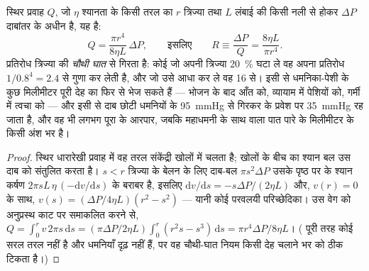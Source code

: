 \begin{theorem}[प्वाज़ेई का नियम और वाहिकीय प्रतिरोध]\label{thm:b2:blood-circulation:poiseuille}
स्थिर प्रवाह $Q$, जो $\eta$ श्यानता के किसी तरल का $r$ त्रिज्या तथा
$L$ लंबाई की किसी नली से होकर $\Delta P$ दाबांतर के अधीन है, यह
है:
\[
Q = \frac{\pi r^{4}}{8\eta L}\,\Delta P, \qquad \text{इसलिए}\qquad
R \equiv \frac{\Delta P}{Q} = \frac{8\eta L}{\pi r^{4}} .
\]
प्रतिरोध त्रिज्या की \emph{चौथी घात} से गिरता है: कोई
 जो अपनी त्रिज्या \qty{20}{\%} घटा ले वह अपना
प्रतिरोध $1/0.8^{4} = 2.4$ से गुणा कर लेती है, और जो उसे आधा कर ले वह 16 से। इसी से
धमनिका-पेशी के कुछ मिलीमीटर पूरी देह का  फिर से भेज
सकते हैं --- भोजन के बाद आँत को, व्यायाम में पेशियों को, गर्मी में
त्वचा को --- और इसी से दाब छोटी धमनियों के
\qty{95}{mmHg} से गिरकर  के प्रवेश पर
\qty{35}{mmHg} रह जाता है, और वह भी लगभग पूरा
 के आरपार, जबकि महाधमनी के साथ वाला पात पारे के मिलीमीटर के
किसी अंश भर है।
\end{theorem}
\begin{proof}
स्थिर धारारेखी प्रवाह में वह तरल संकेंद्री खोलों में चलता है; खोलों
के बीच का श्यान बल उस दाब को संतुलित करता है। $s < r$ त्रिज्या के
बेलन के लिए दाब-बल $\pi s^{2}\Delta P$
उसके पृष्ठ पर के श्यान कर्षण $2\pi s L\,\eta\,(-\mathrm{d}v/
\mathrm{d}s)$ के बराबर है, इसलिए $\mathrm{d}v/\mathrm{d}s = -s\Delta P/(2\eta L)$
और, $v(r) = 0$ के साथ, $v(s) = (\Delta P/4\eta L)(r^{2} - s^{2})$ --- यानी कोई
परवलयी परिच्छेदिका। उस वेग को अनुप्रस्थ काट पर समाकलित करने से,
$Q = \int_{0}^{r} v\,2\pi s\,\mathrm{d}s = (\pi\Delta P/2\eta L)
\int_{0}^{r}(r^{2}s - s^{3})\,\mathrm{d}s = \pi r^{4}\Delta P/8\eta
L$। ( पूरी तरह कोई सरल तरल नहीं है और धमनियाँ दृढ़ नहीं हैं,
पर वह चौथी-घात नियम किसी देह चलाने भर को ठीक टिकता है।)
\end{proof}

